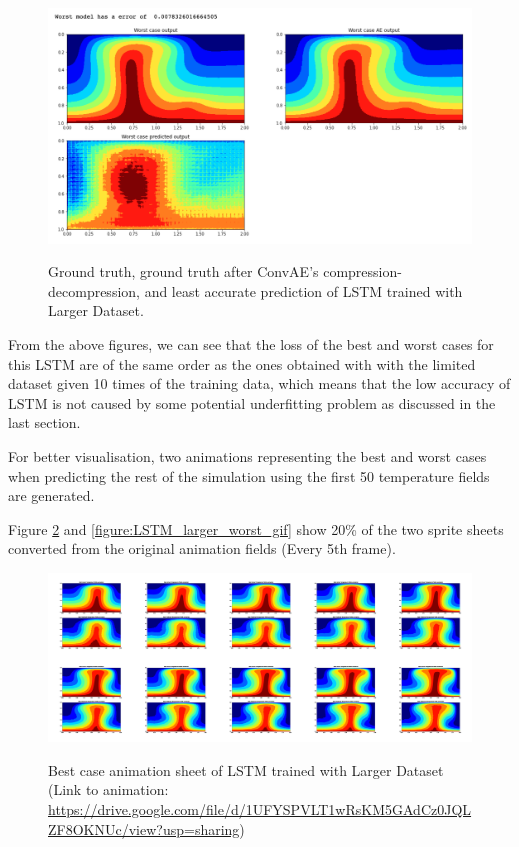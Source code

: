 \begin{figure}[H]
    \caption{Ground truth, ground truth after ConvAE's compression-decompression, and least accurate prediction of LSTM trained with Larger Dataset.}
    \includegraphics[scale=0.5]{figures/mantle_convection_images/larger_dataset/LSTM_Worst.png}
    \label{figure:LSTM_larger_worst}
\end{figure}


From the above figures, we can see that the loss of the best and worst cases for this LSTM are of the same order as the ones obtained with with the limited dataset given 10 times of the training data, which means that the low accuracy of LSTM is not caused by some potential underfitting problem as discussed in the last section.

For better visualisation, two animations representing the best and worst cases when predicting the rest of the simulation using the first 50 temperature fields are generated.

Figure \ref{figure:LSTM_larger_best_gif} and \ref{figure:LSTM_larger_worst_gif} show 20\% of the two sprite sheets converted from the original animation fields (Every 5th frame).

\begin{figure}[H]
    \centering
    \caption{Best case animation sheet of LSTM trained with Larger Dataset (Link to animation: \url{https://drive.google.com/file/d/1UFYSPVLT1wRsKM5GAdCz0JQLZF8OKNUc/view?usp=sharing})}
    \includegraphics[scale=0.10]{figures/mantle_convection_images/larger_dataset/LSTM_Best_GIF_sheet.png}
    \label{figure:LSTM_larger_best_gif}
\end{figure}



